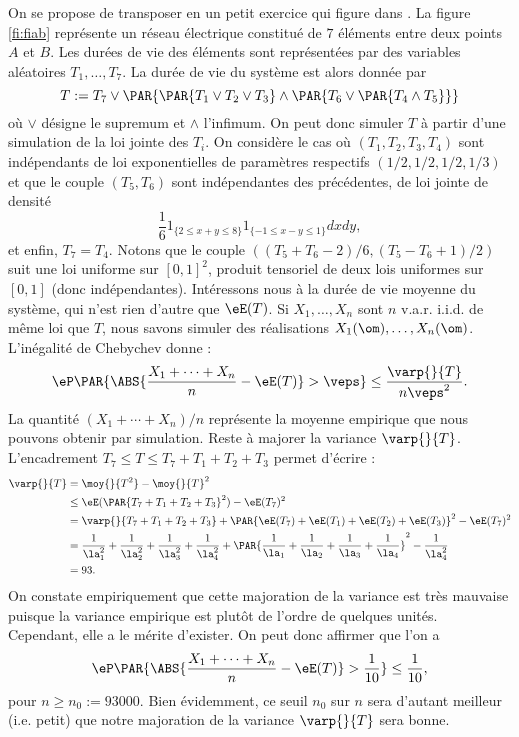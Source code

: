 On se propose de transposer en \ML{} un petit exercice qui figure dans
\cite[page 82]{bouleau}. La figure \ref{fi:fiab} représente un réseau
électrique constitué de $7$ éléments entre deux points $A$ et $B$. Les durées
de vie des éléments sont représentées par des variables aléatoires
$T_1,\ldots,T_7$. La durée de vie du système est alors donnée par
$$
 T := T_7 \lor \PAR{\PAR{T_1 \lor T_2 \lor T_3} \land \PAR{T_6 \lor \PAR{T_4 \land T_5}}}
$$
où $\lor$ désigne le supremum et $\land$ l'infimum. On peut donc simuler $T$
à partir d'une simulation de la loi jointe des $T_i$.
%
%
On considère le cas où $(T_1,T_2,T_3,T_4)$ sont indépendants de loi
exponentielles de paramètres respectifs $(1/2,1/2,1/2,1/3)$ et que le couple
$(T_5,T_6)$ sont indépendantes des précédentes, de loi jointe de densité
$$
\frac{1}{6} 1_{\{2\leq x+y \leq 8\}} 1_{\{-1\leq x-y \leq 1\}} dx dy,
$$
et enfin, $T_7=T_4$.  Notons que le couple $((T_5+T_6-2)/6,(T_5-T_6+1)/2)$
suit une loi uniforme sur $[0,1]^2$, produit tensoriel de deux lois uniformes
sur $[0,1]$ (donc indépendantes).
%
%
Intéressons nous à la durée de vie moyenne du système, qui n'est rien d'autre
que $\eE(T)$.  Si $X_1,\ldots,X_n$ sont $n$ v.a.r. i.i.d. de même loi que $T$,
nous savons simuler des réalisations $X_1(\om),\ldots,X_n(\om)$. L'inégalité
de Chebychev donne :
$$
\eP\PAR{\ABS{\frac{X_1+\cdots+X_n}{n}-\eE(T)}>\veps} \leq\frac{\varp{}{T}}{n\veps^2}.
$$
La quantité $(X_1+\cdots+X_n)/n$ représente la moyenne empirique que nous
pouvons obtenir par simulation. Reste à majorer la variance $\varp{}{T}$.
L'encadrement $T_7 \leq T \leq T_7+T_1+T_2+T_3$ permet d'écrire :
\begin{align*}
  \varp{}{T}&=\moy{}{T^2}-\moy{}{T}^2\\
  &\leq\eE(\PAR{T_7+T_1+T_2+T_3}^2)-\eE(T_7)^2\\
  &=\varp{}{T_7+T_1+T_2+T_3}+\PAR{\eE(T_7)+\eE(T_1)+\eE(T_2)+\eE(T_3)}^2-\eE(T_7)^2\\
  &=\frac{1}{\la_1^2}+\frac{1}{\la_2^2}+\frac{1}{\la_3^2}+\frac{1}{\la_4^2}
  +\PAR{\frac{1}{\la_1}+\frac{1}{\la_2}+\frac{1}{\la_3}+\frac{1}{\la_4}}^2
  -\frac{1}{\la_4^2}\\
  &=93.
\end{align*}
On constate empiriquement que cette majoration de la variance est très
mauvaise puisque la variance empirique est plutôt de l'ordre de quelques
unités. Cependant, elle a le mérite d'exister.  On peut donc affirmer que l'on
a
$$
\eP\PAR{\ABS{\frac{X_1+\cdots+X_n}{n}-\eE(T)}>\frac{1}{10}}
\leq\frac{1}{10},
$$
pour $n\geq n_0:=93000$. Bien évidemment, ce seuil $n_0$ sur $n$ sera
d'autant meilleur (i.e. petit) que notre majoration de la variance $\varp{}{T}$
sera bonne. 

